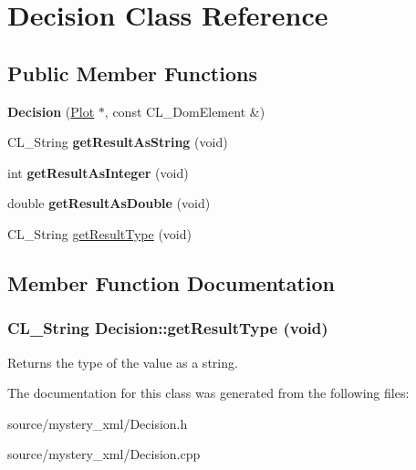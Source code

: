 \hypertarget{classDecision}{
\section{Decision Class Reference}
\label{classDecision}
}
\subsection*{Public Member Functions}
\begin{DoxyCompactItemize}
\item 
\hypertarget{classDecision_a7b8d8d0b3afb1ac36398d062118f6d6b}{
{\bfseries Decision} (\hyperlink{classPlot}{Plot} $\ast$, const CL\_\-DomElement \&)}
\label{classDecision_a7b8d8d0b3afb1ac36398d062118f6d6b}

\item 
\hypertarget{classDecision_ae6d6d18b9890c8706bd5986978be69b6}{
CL\_\-String {\bfseries getResultAsString} (void)}
\label{classDecision_ae6d6d18b9890c8706bd5986978be69b6}

\item 
\hypertarget{classDecision_a76817bb860641012831b8d5d7857562a}{
int {\bfseries getResultAsInteger} (void)}
\label{classDecision_a76817bb860641012831b8d5d7857562a}

\item 
\hypertarget{classDecision_a8ad5b405e0f154ffe064cb4f548b7931}{
double {\bfseries getResultAsDouble} (void)}
\label{classDecision_a8ad5b405e0f154ffe064cb4f548b7931}

\item 
CL\_\-String \hyperlink{classDecision_a3b4bc70a203e47be88bfdb6d5e059ffb}{getResultType} (void)
\end{DoxyCompactItemize}


\subsection{Member Function Documentation}
\hypertarget{classDecision_a3b4bc70a203e47be88bfdb6d5e059ffb}{
\subsubsection[{getResultType}]{\setlength{\rightskip}{0pt plus 5cm}CL\_\-String Decision::getResultType (void)}}
\label{classDecision_a3b4bc70a203e47be88bfdb6d5e059ffb}
Returns the type of the value as a string. 

The documentation for this class was generated from the following files:\begin{DoxyCompactItemize}
\item 
source/mystery\_\-xml/Decision.h\item 
source/mystery\_\-xml/Decision.cpp\end{DoxyCompactItemize}
